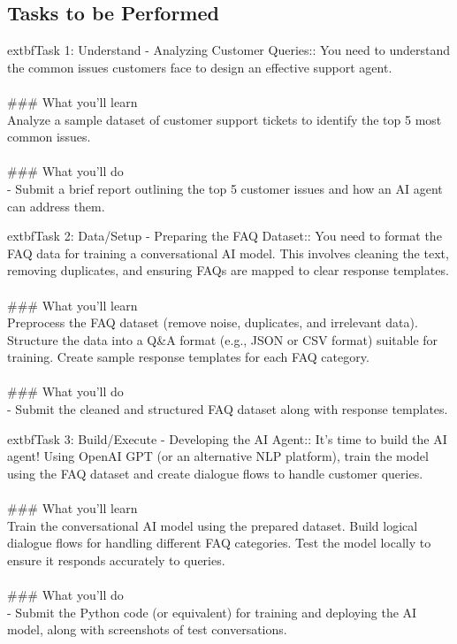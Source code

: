 \documentclass{article}
\begin{document}
\subsection*{Tasks to be Performed}
	extbf{Task 1:} Understand - Analyzing Customer Queries:: You need to understand the common issues customers face to design an effective support agent. \\
 \\
### What you'll learn \\
Analyze a sample dataset of customer support tickets to identify the top 5 most common issues. \\
 \\
### What you'll do \\
- Submit a brief report outlining the top 5 customer issues and how an AI agent can address them.

	extbf{Task 2:} Data/Setup - Preparing the FAQ Dataset:: You need to format the FAQ data for training a conversational AI model. This involves cleaning the text, removing duplicates, and ensuring FAQs are mapped to clear response templates. \\
 \\
### What you'll learn \\
Preprocess the FAQ dataset (remove noise, duplicates, and irrelevant data). Structure the data into a Q&A format (e.g., JSON or CSV format) suitable for training. Create sample response templates for each FAQ category. \\
 \\
### What you'll do \\
- Submit the cleaned and structured FAQ dataset along with response templates.

	extbf{Task 3:} Build/Execute - Developing the AI Agent:: It's time to build the AI agent! Using OpenAI GPT (or an alternative NLP platform), train the model using the FAQ dataset and create dialogue flows to handle customer queries. \\
 \\
### What you'll learn \\
Train the conversational AI model using the prepared dataset. Build logical dialogue flows for handling different FAQ categories. Test the model locally to ensure it responds accurately to queries. \\
 \\
### What you'll do \\
- Submit the Python code (or equivalent) for training and deploying the AI model, along with screenshots of test conversations.
\end{document}

